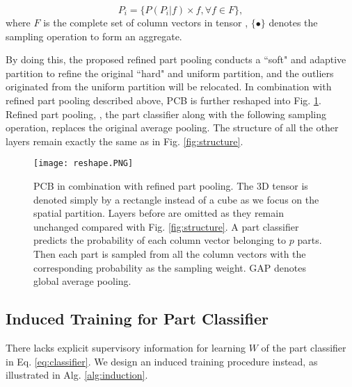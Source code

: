 \documentclass[10pt,twocolumn,letterpaper]{article}
\begin{document}
\begin{equation}P_i=\{P(P_i|f) \times f, \forall {f \in F}\},\end{equation}
where $F$ is the complete set of column vectors in tensor , $\{\bullet\}$ denotes the sampling operation to form an aggregate. 

By doing this, the proposed refined part pooling conducts a ``soft" and adaptive partition to refine the original ``hard" and uniform partition, and the outliers originated from the uniform partition will be relocated. In combination with refined part pooling described above, PCB is further reshaped into Fig. \ref{fig:reshape}. Refined part pooling, \ie, the part classifier along with the following sampling operation, replaces the original average pooling. The structure of all the other layers remain exactly the same as in Fig. \ref{fig:structure}. 


\begin{figure}[t]
\setlength{\abovecaptionskip}{-0.1cm} 
\setlength{\belowcaptionskip}{-0.2cm}
\begin{center}
\texttt{[image: reshape.PNG]}
\end{center}
   \caption{PCB in combination with refined part pooling. The 3D tensor  is denoted simply by a rectangle instead of a cube as we focus on the spatial partition. Layers before  are omitted as they remain unchanged compared with Fig. \ref{fig:structure}. A part classifier predicts the probability of each column vector belonging to $p$ parts. Then each part is sampled from all the column vectors with the corresponding probability as the sampling weight. GAP denotes global average pooling. }
\label{fig:reshape}
\end{figure}


\subsection{Induced Training for Part Classifier}\label{sec:train}

There lacks explicit supervisory information for learning $W$ of the part classifier in Eq. \ref{eq:classifier}. 
We design an induced training procedure instead, as illustrated in Alg. \ref{alg:induction}.
\end{document}

